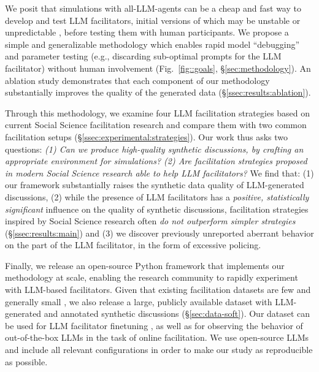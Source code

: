 We posit that simulations with all-LLM-agents can be a cheap and fast way to develop and test  LLM facilitators, initial versions of which may be unstable or unpredictable \cite{atil_2025, rossi_2024}, before testing them with human participants. We propose a simple and generalizable methodology which enables rapid model “debugging” and parameter testing (e.g., discarding sub-optimal  prompts for the LLM facilitator) without human involvement (Fig.~\ref{fig::goals}, \S\ref{sec:methodology}). An ablation study demonstrates that each component of our methodology substantially improves the quality of the generated data (\S\ref{ssec:results:ablation}). 

Through this methodology, we examine  four LLM facilitation strategies based on current Social Science facilitation research and compare them with two common facilitation setups (\S\ref{ssec:experimental:strategies}). Our work thus asks two questions: \emph{(1) Can we produce high-quality synthetic discussions, by crafting an appropriate environment for simulations? (2) Are facilitation strategies proposed in modern Social Science research able to help LLM facilitators?} We find that: (1) our framework substantially raises the synthetic data quality of LLM-generated discussions, (2) while the presence of LLM facilitators has a \emph{positive, statistically significant} influence on the quality of synthetic discussions, facilitation strategies inspired by Social Science research often \emph{do not outperform simpler strategies} (\S\ref{ssec:results:main}) and (3) we discover previously unreported aberrant behavior on the part of the LLM facilitator, in the form of excessive policing.

Finally, we release an open-source Python framework that implements our methodology at scale, enabling the research community to rapidly experiment with LLM-based facilitators. Given that existing facilitation datasets are few and generally small \citep{korre2025evaluation}, we also release \vmd a large, publicly available dataset with LLM-generated and annotated synthetic discussions (\S\ref{sec:data-soft}). Our dataset can be used for LLM facilitator finetuning \cite{ulmer2024}, as well as for observing the behavior of out-of-the-box LLMs in the task of online facilitation. We use open-source LLMs and include all relevant configurations in order to make our study as reproducible as possible.
